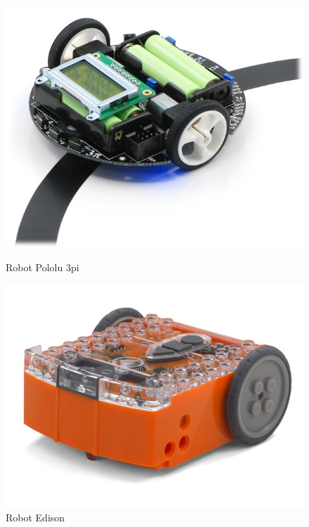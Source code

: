 \begin{figure}[h]
	\begin{minipage}[b]{.5\textwidth}
		\centering
		\includegraphics[width=\textwidth]{images/pololu-3pi-robot-8-on-line.jpg}
		\caption[Robot Pololu 3pi]{Robot Pololu 3pi\protect\footnotemark}
		\label{fig:pololu-3pi-robot-8-on-line}
	\end{minipage}
	\hfill
	\begin{minipage}[b]{.5\textwidth}
		\centering
		\includegraphics[width=\textwidth]{images/Edison-Educational-robot.jpg}
		\caption[Robot Edison]{Robot Edison\protect\footnotemark}
		\label{fig:Edison-Educational-robot}
	\end{minipage}
\end{figure}


